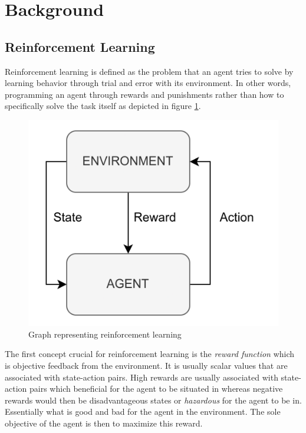 \section{Background}

\subsection{Reinforcement Learning}

Reinforcement learning is defined as the problem that an agent tries to solve by learning behavior through trial and error with its environment. In other words, programming an agent through rewards and punishments rather than how to specifically solve the task itself\cite{kaelbling1996reinforcement} as depicted in figure \ref{figRL}.
\begin{figure}[H]
    \centering
    \includegraphics [scale = 0.2]{Images/RL_graph.png}
    \caption{Graph representing reinforcement learning}
    \label{figRL}
\end{figure}
The first concept crucial for reinforcement learning is the \textit{reward function} which is objective feedback from the environment. It is usually scalar values that are associated with state-action pairs. High rewards are usually associated with state-action pairs which beneficial for the agent to be situated in whereas negative rewards would then be disadvantageous states or \textit{hazardous} for the agent to be in. Essentially what is good and bad for the agent in the environment. The sole objective of the agent is then to maximize this reward\cite{sutton1999reinforcement}.

